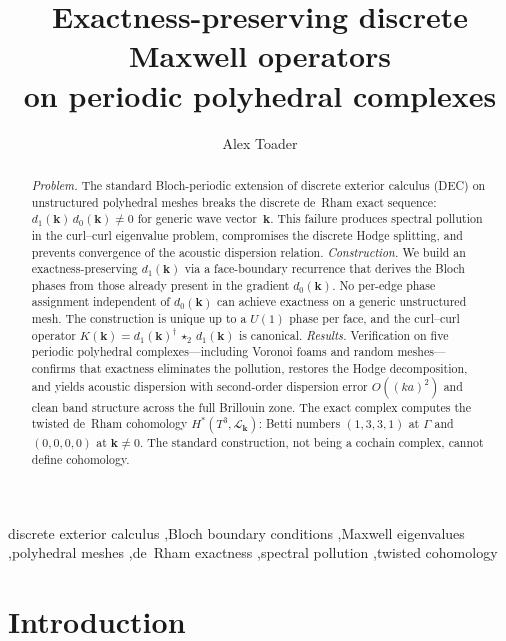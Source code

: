 \documentclass[preprint,12pt]{elsarticle}
\begin{document}
\begin{frontmatter}

\title{Exactness-preserving discrete Maxwell operators\\on periodic polyhedral complexes}

\author{Alex Toader}
\address{Independent researcher}

\begin{abstract}
\emph{Problem.}
The standard Bloch-periodic extension of discrete exterior calculus (DEC) on unstructured polyhedral meshes breaks the discrete de~Rham exact sequence: $d_1(\mathbf{k})\,d_0(\mathbf{k}) \neq 0$ for generic wave vector~$\mathbf{k}$. This failure produces spectral pollution in the curl--curl eigenvalue problem, compromises the discrete Hodge splitting, and prevents convergence of the acoustic dispersion relation.
%
\emph{Construction.}
We build an exactness-preserving $d_1(\mathbf{k})$ via a face-boundary recurrence that derives the Bloch phases from those already present in the gradient $d_0(\mathbf{k})$. No per-edge phase assignment independent of $d_0(\mathbf{k})$ can achieve exactness on a generic unstructured mesh. The construction is unique up to a $U(1)$ phase per face, and the curl--curl operator $K(\mathbf{k}) = d_1(\mathbf{k})^\dagger\,\star_2\,d_1(\mathbf{k})$ is canonical.
%
\emph{Results.}
Verification on five periodic polyhedral complexes---including Voronoi foams and random meshes---confirms that exactness eliminates the pollution, restores the Hodge decomposition, and yields acoustic dispersion with second-order dispersion error $O((ka)^2)$ and clean band structure across the full Brillouin zone. The exact complex computes the twisted de~Rham cohomology $H^*(T^3, \mathcal{L}_\mathbf{k})$: Betti numbers $(1,3,3,1)$ at $\Gamma$ and $(0,0,0,0)$ at $\mathbf{k} \neq 0$. The standard construction, not being a cochain complex, cannot define cohomology.
\end{abstract}

\begin{keyword}
discrete exterior calculus \sep Bloch boundary conditions \sep Maxwell eigenvalues \sep polyhedral meshes \sep de~Rham exactness \sep spectral pollution \sep twisted cohomology
\end{keyword}

\end{frontmatter}

\section{Introduction}
\label{sec:intro}
\end{document}

